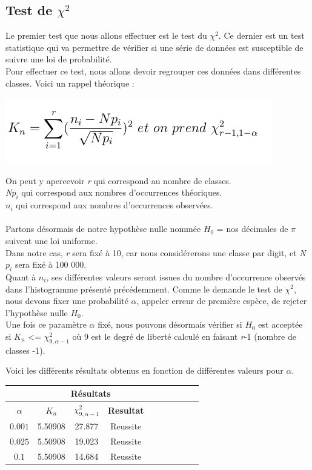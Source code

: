 \documentclass[french]{article}
\begin{document}
\subsection{Test de $\chi^{2}$ }
Le premier test que nous allons effectuer est le test du \textbf{$\chi^{2}$}. Ce dernier est un test statistique qui va permettre de vérifier si une série de données est susceptible de suivre une loi de probabilité.
\\
Pour effectuer ce test, nous allons devoir regrouper ces données dans différentes classes.
Voici un rappel théorique :

	\begin{center}
		\includegraphics[scale=0.60]{Archives/Images/khi2}
	\end{center}
	
On peut y apercevoir \textit{r} qui correspond au nombre de classes. \\
\textit{N$p_{i}$} qui correspond aux nombres d'occurrences théoriques. \\
\textit{$n_{i}$} qui correspond aux nombres d'occurrences observées.
\\
\\
Partons désormais de notre hypothèse nulle nommée $H_{0}$ = {nos décimales de $\pi$ suivent une loi uniforme}.
\\
Dans notre cas, \textit{r} sera fixé à 10, car nous considérerons une classe par digit, et \textit{N$p_{i}$} sera fixé à 100 000.\\ 
Quant à \textit{$n_{i}$}, ses différentes valeurs seront issues du nombre d'occurrence observés dans l'histogramme présenté précédemment.
Comme le demande le test de \textbf{$\chi^{2}$}, nous devons fixer une probabilité $\alpha$, appeler erreur de première espèce, de rejeter l'hypothèse nulle $H_{0}$.
\\
Une fois ce paramètre $\alpha$ fixé, nous pouvons désormais vérifier si $H_{0}$ est acceptée
si $K_{n}$ <= $\chi^{2}_{9,\alpha-1}$ où 9 est le degré de liberté calculé en faisant \textit{r}-1 (nombre de classes -1).

Voici les différents résultats obtenus en fonction de différentes valeurs pour $\alpha$.
\\
\begin{longtable}{|c|c|c|c|c|c|c|c|c|c|}
	\hline
	& \multicolumn{3}{c|}{\textbf{Résultats}} \\ 
	\hline 
	\textbf{$\alpha$}  & $K_{n}$ & $\chi^{2}_{9,\alpha-1}$ & \textbf{Resultat} \\ 
	\hline 
	$$0.001$$ & 5.50908 & 27.877 & Reussite\\ 
	\hline 
	$$0.025$$ & 5.50908 & 19.023 & Reussite\\ 
	\hline 
	$$0.1$$ & 5.50908 & 14.684 & Reussite \\ 
	\hline 
\end{longtable}
\end{document}
